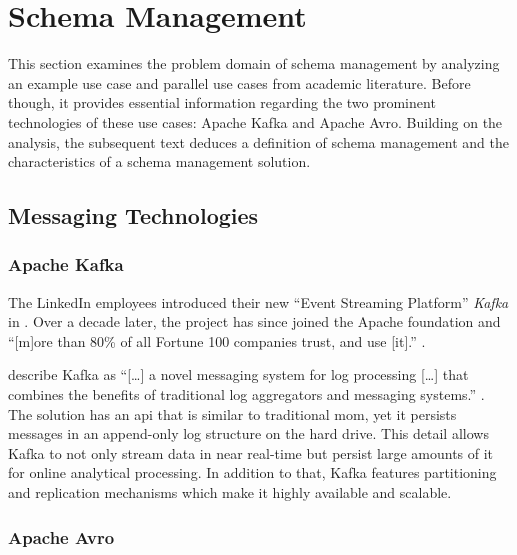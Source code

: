 
\section{Schema Management}\label{sec:schema-management}

This section examines the problem domain of schema management by analyzing an example use case and parallel use cases from academic literature.
Before though, it provides essential information regarding the two prominent technologies of these use cases: Apache Kafka and Apache Avro.
Building on the analysis, the subsequent text deduces a definition of schema management and the characteristics of a schema management solution.

\subsection{Messaging Technologies}

\subsubsection{Apache Kafka}

The LinkedIn employees \citeauthor{kreps_kafka_2011} introduced their new \enquote{Event Streaming Platform} \emph{Kafka} in \citeyear{kreps_kafka_2011}. \parencite{kreps_kafka_2011}
Over a decade later, the project has since joined the Apache foundation and \enquote{[m]ore than 80\% of all Fortune 100 companies trust, and use [it].} \parencite{apache_software_foundation_apache_nodate}.

\citeauthor{kreps_kafka_2011} describe Kafka as \enquote{[\ldots] a novel messaging system for log processing [\ldots] that combines the benefits of traditional log aggregators and messaging systems.} \parencite{kreps_kafka_2011}.
The solution has an \gls{api} that is similar to traditional \gls{mom}, yet it persists messages in an append-only log structure on the hard drive.
This detail allows Kafka to not only stream data in near real-time but persist large amounts of it for online analytical processing.
In addition to that, Kafka features partitioning and replication mechanisms which make it highly available and scalable. \parencite{kreps_kafka_2011}



\subsubsection{Apache Avro}

